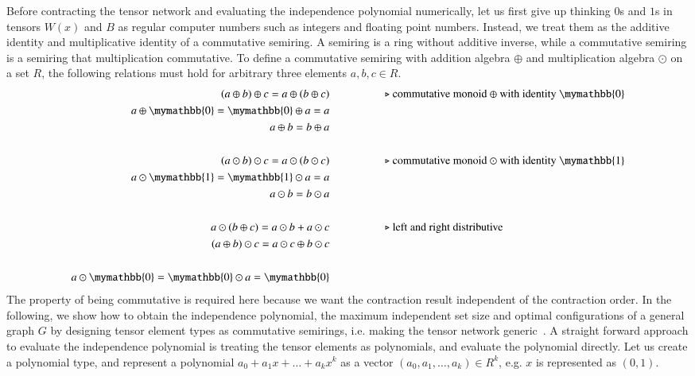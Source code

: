 \documentclass[review,onefignum,onetabnum]{siamart190516}
\newcommand{\<}{\langle}
\renewcommand{\>}{\rangle}
\begin{document}
Before contracting the tensor network and evaluating the independence polynomial numerically, let us first give up thinking $0$s and $1$s in tensors $W(x)$ and $B$ as regular computer numbers such as integers and floating point numbers.
Instead, we treat them as the additive identity and multiplicative identity of a commutative semiring.
A semiring is a ring without additive inverse, while a commutative semiring is a semiring that multiplication commutative.
To define a commutative semiring with addition algebra $\oplus$ and multiplication algebra $\odot$ on a set $R$, the following relations must hold for arbitrary three elements $a, b, c \in R$.
\begin{align*}
(a \oplus b) \oplus c = a \oplus (b \oplus c) & \hspace{5em}\text{$\triangleright$ commutative monoid $\oplus$ with identity $\mymathbb{0}$}\\
a \oplus \mymathbb{0} = \mymathbb{0} \oplus a = a &\\
a \oplus b = b \oplus a &\\
&\\
(a \odot b) \odot c = a \odot (b \odot c)  &   \hspace{5em}\text{$\triangleright$ commutative monoid $\odot$ with identity $\mymathbb{1}$}\\
a \odot  \mymathbb{1} =  \mymathbb{1} \odot a = a &\\
a \odot b = b \odot a &\\
&\\
a \odot (b\oplus c) = a\odot b + a\odot c  &  \hspace{5em}\text{$\triangleright$ left and right distributive}\\
(a\oplus b) \odot c = a\odot c \oplus b\odot c &\\
&\\
a \odot \mymathbb{0} = \mymathbb{0} \odot a = \mymathbb{0}
\end{align*}
The property of being commutative is required here because we want the contraction result independent of the contraction order.
In the following, we show how to obtain the independence polynomial, the maximum independent set size and optimal configurations of a general graph $G$ by designing tensor element types as commutative semirings,
i.e. making the tensor network generic~\cite{Stepanov2014}.
A straight forward approach to evaluate the independence polynomial is treating the tensor elements as polynomials, and evaluate the polynomial directly.
Let us create a polynomial type, and represent a polynomial $a_0 + a_1 x + \ldots + a_k x^k$ as a vector $(a_0, a_1, \ldots, a_k) \in R^k$, e.g. $x$ is represented as $(0, 1)$.
\end{document}
